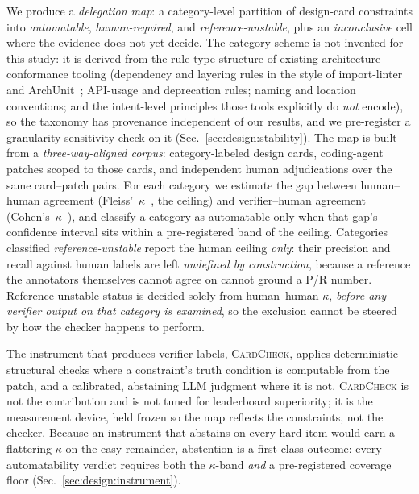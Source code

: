 \documentclass[conference]{IEEEtran}
\newcommand{\cardcheck}{\textsc{CardCheck}}
\begin{document}
We produce a \emph{delegation map}: a category-level partition of design-card
constraints into \emph{automatable}, \emph{human-required}, and
\emph{reference-unstable}, plus an \emph{inconclusive} cell where the evidence
does not yet decide. The category scheme is not invented for this study: it is
derived from the rule-type structure of existing architecture-conformance
tooling (dependency and layering rules in the style of
import-linter~\cite{importlinter} and ArchUnit~\cite{archunit}; API-usage and
deprecation rules; naming and location conventions; and the intent-level
principles those tools explicitly do \emph{not} encode), so the taxonomy has
provenance independent of our results, and we pre-register a
granularity-sensitivity check on it (Sec.~\ref{sec:design:stability}). The map
is built from a \emph{three-way-aligned corpus}: category-labeled design cards,
coding-agent patches scoped to those cards, and independent human adjudications
over the same card--patch pairs. For each category we estimate the gap between
human--human agreement (Fleiss'~$\kappa$~\cite{fleiss1971}, the ceiling) and
verifier--human agreement (Cohen's~$\kappa$~\cite{cohen1960}), and classify a
category as automatable only when that gap's confidence interval sits within a
pre-registered band of the ceiling. Categories classified
\emph{reference-unstable} report the human ceiling \emph{only}: their precision
and recall against human labels are left \emph{undefined by construction},
because a reference the annotators themselves cannot agree on cannot ground a
P/R number. Reference-unstable status is decided solely from human--human
$\kappa$, \emph{before any verifier output on that category is examined}, so the
exclusion cannot be steered by how the checker happens to perform.

The instrument that produces verifier labels, \cardcheck{}, applies
deterministic structural checks where a constraint's truth condition is
computable from the patch, and a calibrated, abstaining LLM judgment where it is
not. \cardcheck{} is not the contribution and is not tuned for leaderboard
superiority; it is the measurement device, held frozen so the map reflects the
constraints, not the checker. Because an instrument that abstains on every hard
item would earn a flattering $\kappa$ on the easy remainder, abstention is a
first-class outcome: every automatability verdict requires both the
$\kappa$-band \emph{and} a pre-registered coverage floor
(Sec.~\ref{sec:design:instrument}).
\end{document}
